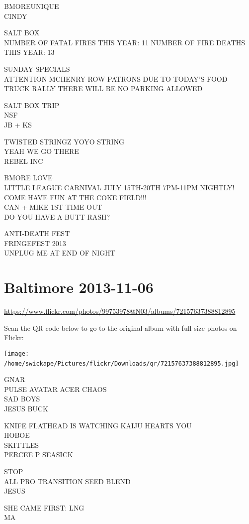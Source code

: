 \documentclass[10pt,letterpaper]{article}
\begin{document}
BMOREUNIQUE\\
CINDY

SALT BOX\\
NUMBER OF FATAL FIRES THIS YEAR: 11 NUMBER OF FIRE DEATHS THIS YEAR: 13

SUNDAY SPECIALS\\
ATTENTION MCHENRY ROW PATRONS DUE TO TODAY'S FOOD TRUCK RALLY THERE WILL BE NO PARKING ALLOWED

SALT BOX TRIP\\
NSF\\
JB + KS

TWISTED STRINGZ YOYO STRING\\
YEAH WE GO THERE\\
REBEL INC

BMORE LOVE\\
LITTLE LEAGUE CARNIVAL JULY 15TH{-}20TH 7PM{-}11PM NIGHTLY! COME HAVE FUN AT THE COKE FIELD!!!\\
CAN + MIKE 1ST TIME OUT\\
DO YOU HAVE A BUTT RASH?

ANTI{-}DEATH FEST\\
FRINGEFEST 2013\\
UNPLUG ME AT END OF NIGHT
\

\section*{Baltimore 2013-11-06}

\url{https://www.flickr.com/photos/99753978@N03/albums/72157637388812895}

Scan the QR code below to go to the original album with full-size photos on Flickr:

\texttt{[image: /home/swickape/Pictures/flickr/Downloads/qr/72157637388812895.jpg]}
\

GNAR\\
PULSE AVATAR ACER CHAOS\\
SAD BOYS\\
JESUS BUCK

KNIFE FLATHEAD IS WATCHING KAIJU HEARTS YOU\\
HOBOE\\
SKITTLES\\
PERCEE P SEASICK

STOP\\
ALL PRO TRANSITION SEED BLEND\\
JESUS

SHE CAME FIRST: LNG\\
MA
\end{document}
